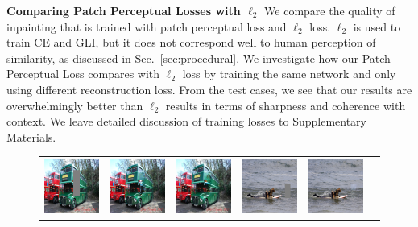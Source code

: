 \noindent\textbf{Comparing Patch Perceptual Losses with $\ell_2$} We compare the quality of inpainting that is trained with patch perceptual loss and $\ell_2$ loss. $\ell_2$ is used to train CE and GLI, but it does not correspond well to human perception of similarity, as discussed in Sec.~\ref{sec:procedural}. We investigate how our Patch Perceptual Loss compares with $\ell_2$ loss by training the same network and only using different reconstruction loss. From the test cases, we see that our results are overwhelmingly better than $\ell_2$ results in terms of sharpness and coherence with context. We leave detailed discussion of training losses to Supplementary Materials.

\begin{figure}[h!]
\centering
\small
\begin{tabular}{cccccc}
\includegraphics[width=.16\textwidth]{figures/loss/000000090208_input_image.png}&
\includegraphics[width=.16\textwidth]{figures/loss/000000090208_synthesized_image.png}&
\includegraphics[width=.16\textwidth]{figures/loss/000000090208_synthesized_image.jpg}&
\includegraphics[width=.16\textwidth]{figures/loss/000000490171_input_image.png}&
\includegraphics[width=.16\textwidth]{figures/loss/000000490171_synthesized_image.png}&

\end{tabular}
\end{figure}
